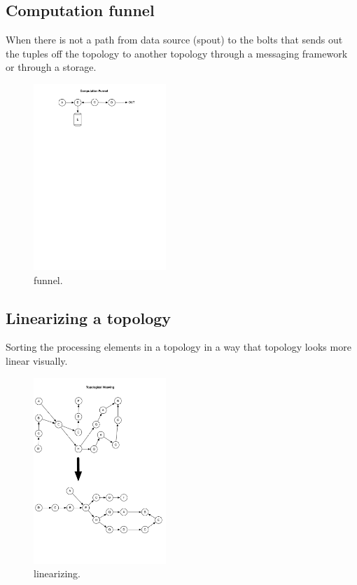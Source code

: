 \subsection{Computation funnel}
When there is not a path from data source (spout) to the bolts that sends out the tuples off the topology to another topology through a messaging framework or through a storage.

\begin{figure}[H]
	\begin{center}
		\includegraphics[width=5cm]{images/funnel}
		\caption{funnel.}
		\label{fig:funnel}
	\end{center}
\end{figure}

\subsection{Linearizing a topology}

Sorting the processing elements in a topology in a way that topology looks more linear visually.

\begin{figure}[H]
	\begin{center}
		\includegraphics[width=5cm]{images/linearizing}
		\caption{linearizing.}
		\label{fig:linearizing}
	\end{center}
\end{figure}